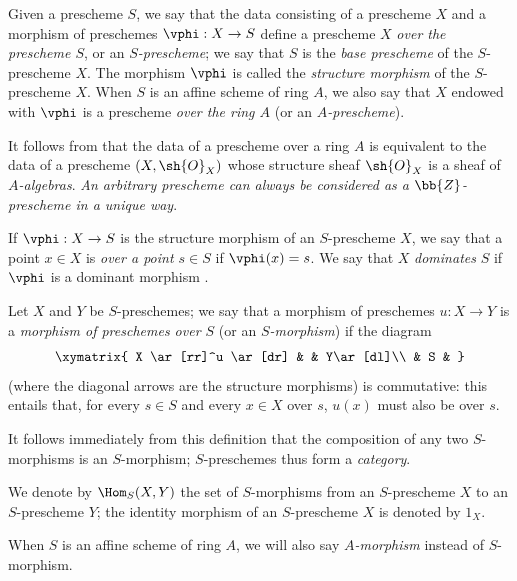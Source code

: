 \begin{definition}[2.5.1]
\label{I.2.5.1}
Given a prescheme $S$, we say that the data consisting of a prescheme $X$ and a morphism of preschemes $\vphi:X\to S$ define a prescheme $X$ \emph{over the prescheme $S$}, or an \emph{$S$-prescheme};
we say that $S$ is the \emph{base prescheme} of the $S$-prescheme $X$.
The morphism $\vphi$ is called the \emph{structure morphism} of the $S$-prescheme $X$.
When $S$ is an affine scheme of ring $A$, we also say that $X$ endowed with $\vphi$ is a prescheme \emph{over the ring $A$} (or an \emph{$A$-prescheme}).
\end{definition}

It follows from  that the data of a prescheme over a ring $A$ is equivalent to the data of a prescheme $(X,\sh{O}_X)$ whose structure sheaf $\sh{O}_X$ is a sheaf of \emph{$A$-algebras}.
\emph{An arbitrary prescheme can always be considered as a $\bb{Z}$-prescheme in a unique way}.

If $\vphi:X\to S$ is the structure morphism of an $S$-prescheme $X$, we
say that a point $x\in X$ is \emph{over a point $s\in S$} if $\vphi(x)=s$. We
say that $X$ \emph{dominates} $S$ if $\vphi$ is a dominant morphism .

\begin{env}[2.5.2]
\label{I.2.5.2}
Let $X$ and $Y$ be $S$-preschemes;
we say that a morphism of preschemes $u:X\to Y$ is a \emph{morphism of preschemes over $S$} (or an \emph{$S$-morphism}) if the diagram
\[
  \xymatrix{
    X \ar[rr]^u \ar[dr] & & Y\ar[dl]\\
    & S &
  }
\]
(where the diagonal arrows are the structure morphisms) is commutative: this entails that, for every $s\in S$ and every $x\in X$ over $s$, $u(x)$ must also be over $s$.
\end{env}

It follows immediately from this definition that the composition of any two $S$-morphisms is an $S$-morphism;
$S$-preschemes thus form a \emph{category}.

We denote by $\Hom_S(X,Y)$ the set of $S$-morphisms from an $S$-prescheme $X$ to an $S$-prescheme $Y$;
the identity morphism of an $S$-prescheme $X$ is denoted by $1_X$.

When $S$ is an affine scheme of ring $A$, we will also say \emph{$A$-morphism} instead of $S$-morphism.

